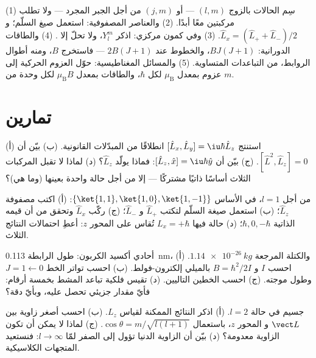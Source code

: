 \begin{method}\label{met:b3:quantum-angular-momentum:method}
(1) سِم الحالات بالزوج $(l, m)$ --- أو $(j, m)$ من أجل الجبر
المجرد --- ولا تطلب مركبتين معًا أبدًا. (2) والعناصر
المصفوفية: استعمل صيغ السلّم؛ و $\hat L_x = (\hat L_+ + \hat
L_-)/2$. (3) وفي كمون مركزي: اذكر $Y_l^m$، ولا تحلّ إلا
 . (4) والطاقات الدورانية:
$BJ(J+1)$، والخطوط عند $2B(J+1)$ --- فاستخرج $B$، ومنه أطوال
الروابط، من التباعدات المتساوية. (5) والمسائل المغناطيسية: حوّل
العزوم الحركية إلى عزوم بمعدل $\mu_{\text{B}}$ لكل $\hbar$، والطاقات
بمعدل $\mu_{\text{B}}B$ لكل وحدة من $m$.
\end{method}

\section{تمارين}

\begin{exercise}[$\star$]\label{exo:b3:quantum-angular-momentum:1}
(أ) استنتج $[\hat L_x, \hat L_y] = \iu\hbar\hat L_z$ انطلاقًا من
المبدّلات القانونية. (ب) بيّن أن $[\hat L^2, \hat L_z] = 0$. (ج) بيّن أن
$[\hat L_z, \hat x] = \iu\hbar\hat y$: فماذا يولّد $\hat L_z$؟
(د) لماذا لا تقبل المركبات الثلاث أساسًا ذاتيًا مشتركًا
--- إلا من أجل حالة واحدة بعينها (وما هي)؟
\end{exercise}

\begin{exercise}[$\star$]\label{exo:b3:quantum-angular-momentum:2}
من أجل $l = 1$، في الأساس $\{\ket{1,1}, \ket{1,0}, \ket{1,-1}\}$:
(أ) اكتب مصفوفة $\hat L_z$؛ (ب) استعمل صيغة السلّم لتكتب
$\hat L_+$ و $\hat L_-$؛ (ج) ركّب $\hat L_x$ وتحقق من أن
قيمه الذاتية $\hbar, 0, -\hbar$؛ (د) حالة فيها $L_x =
+\hbar$ تُقاس على المحور $z$: أعطِ احتمالات النتائج
الثلاث.
\end{exercise}

\begin{exercise}[$\star$]\label{exo:b3:quantum-angular-momentum:3}
أحادي أكسيد الكربون: طول الرابطة \qty{0.113}{nm}، والكتلة المرجعة
$\qty{1.14e-26}{kg}$. (أ) احسب $I$ و $B = \hbar^2/2I$ بالميلي إلكترون-فولط.
(ب) احسب تواتر الخط $J = 1 \leftarrow 0$ وطول موجته.
(ج) احسب الخطين التاليين. (د) تقيس فلكية تباعد المشط
بخمسة أرقام: فأيّ مقدار جزيئي تحصل عليه، وبأيّ دقة؟
\end{exercise}

\begin{exercise}[$\star$]\label{exo:b3:quantum-angular-momentum:4}
جسيم في حالة $l = 2$. (أ) اذكر النتائج الممكنة
لقياس $L_z$. (ب) احسب أصغر زاوية بين $\vect L$ و
المحور $z$، باستعمال $\cos\theta = m/\sqrt{l(l+1)}$. (ج) لماذا
لا يمكن أن تكون الزاوية معدومة؟ (د) بيّن أن الزاوية الدنيا تؤول إلى
الصفر لمّا $l \to \infty$: فنستعيد المتجهات الكلاسيكية.
\end{exercise}

